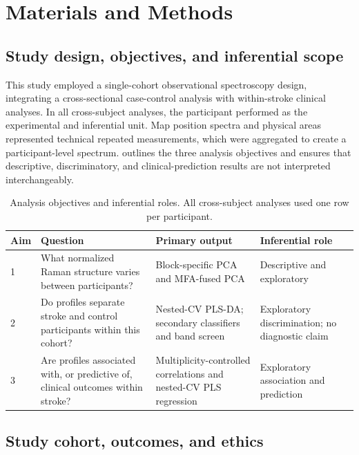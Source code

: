 \documentclass[preprint,12pt]{elsarticle}
\begin{document}
\section{Materials and Methods} 
\label{sec:methods}

\subsection{Study design, objectives, and inferential scope} \label{subsec:design}

This study employed a single-cohort observational spectroscopy design, integrating a cross-sectional case-control analysis with within-stroke clinical analyses. In all cross-subject analyses, the participant performed as the experimental and inferential unit. Map position spectra and physical areas represented technical repeated measurements, which were aggregated to create a participant-level spectrum.  outlines the three analysis objectives and ensures that descriptive, discriminatory, and clinical-prediction results are not interpreted interchangeably.

\begin{table}[htbp] 
\centering 
\caption{Analysis objectives and inferential roles. All cross-subject analyses used one row per participant.} 
\label{tab:analysis_objectives} 
\small 
\begin{tabularx}{\textwidth}{@{}p{} >{\raggedright\arraybackslash}p{} >{\raggedright\arraybackslash}p{} >{\raggedright\arraybackslash}X@{}} 
\toprule 
Aim & Question & Primary output & Inferential role \\ 
\midrule 
1 & What normalized Raman structure varies between participants? & Block-specific PCA and MFA-fused PCA & Descriptive and exploratory \\ 
2 & Do profiles separate stroke and control participants within this cohort? & Nested-CV PLS-DA; secondary classifiers and band screen & Exploratory discrimination; no diagnostic claim \\
3 & Are profiles associated with, or predictive of, clinical outcomes within stroke? & Multiplicity-controlled correlations and nested-CV PLS regression & Exploratory association and prediction \\
\bottomrule 
\end{tabularx} 
\end{table}

\subsection{Study cohort, outcomes, and ethics} 
\label{subsec:cohort}
\end{document}
